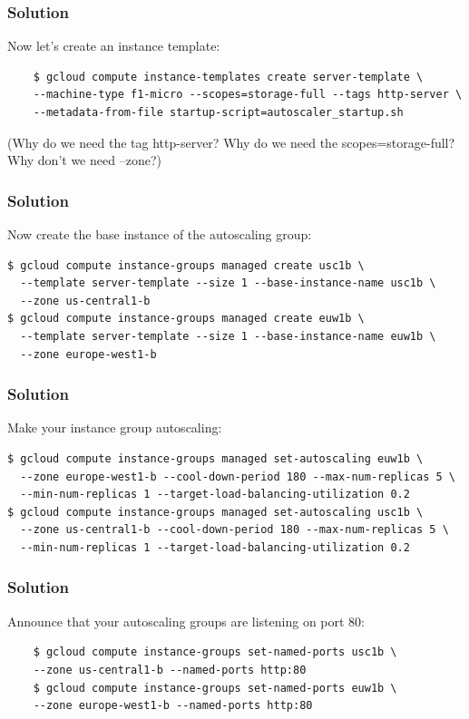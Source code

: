 \documentclass[9pt]{beamer}
\begin{document}
\begin{frame}[fragile]
  \frametitle{Solution}
  Now let's create an instance template:
  \begin{verbatim}
    $ gcloud compute instance-templates create server-template \
    --machine-type f1-micro --scopes=storage-full --tags http-server \
    --metadata-from-file startup-script=autoscaler_startup.sh
  \end{verbatim}
  (Why do we need the tag http-server? Why do we need the scopes=storage-full? Why don't we need --zone?)
\end{frame}

\begin{frame}[fragile]
  \frametitle{Solution}
  Now create the base instance of the autoscaling group:
  \begin{verbatim}
$ gcloud compute instance-groups managed create usc1b \
  --template server-template --size 1 --base-instance-name usc1b \
  --zone us-central1-b
$ gcloud compute instance-groups managed create euw1b \
  --template server-template --size 1 --base-instance-name euw1b \
  --zone europe-west1-b
  \end{verbatim}
\end{frame}

\begin{frame}[fragile]
  \frametitle{Solution}
    Make your instance group autoscaling:
    \begin{verbatim}
$ gcloud compute instance-groups managed set-autoscaling euw1b \
  --zone europe-west1-b --cool-down-period 180 --max-num-replicas 5 \
  --min-num-replicas 1 --target-load-balancing-utilization 0.2      
$ gcloud compute instance-groups managed set-autoscaling usc1b \
  --zone us-central1-b --cool-down-period 180 --max-num-replicas 5 \
  --min-num-replicas 1 --target-load-balancing-utilization 0.2
  \end{verbatim}
\end{frame}

\begin{frame}[fragile]
  \frametitle{Solution}
  Announce that your autoscaling groups are listening on port 80:
  \begin{verbatim}
    $ gcloud compute instance-groups set-named-ports usc1b \
    --zone us-central1-b --named-ports http:80
    $ gcloud compute instance-groups set-named-ports euw1b \
    --zone europe-west1-b --named-ports http:80
  \end{verbatim}
\end{frame}
\end{document}
